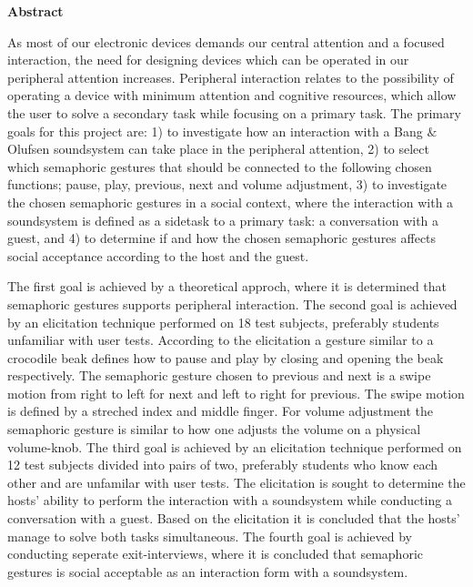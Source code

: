 \begin{center}
	\textbf{{\huge Abstract}}
\end{center}
%
As most of our electronic devices demands our central attention and a focused interaction, the need for designing devices which can be operated in our peripheral attention increases. Peripheral interaction relates to the possibility of operating a device with minimum attention and cognitive resources, which allow the user to solve a secondary task while focusing on a primary task. The primary goals for this project are: 1) to investigate how an interaction with a Bang $\&$ Olufsen soundsystem can take place in the peripheral attention, 2) to select which semaphoric gestures that should be connected to the following chosen functions; pause, play, previous, next and volume adjustment, 3) to investigate the chosen semaphoric gestures in a social context, where the interaction with a soundsystem is defined as a sidetask to a primary task: a conversation with a guest, and 4) to determine if and how the chosen semaphoric gestures affects social acceptance according to the host and the guest.            

The first goal is achieved by a theoretical approch, where it is determined that semaphoric gestures supports peripheral interaction. The second goal is achieved by an elicitation technique performed on 18 test subjects, preferably students unfamiliar with user tests. According to the elicitation a gesture similar to a crocodile beak defines how to pause and play by closing and opening the beak respectively. The semaphoric gesture chosen to previous and next is a swipe motion from right to left for next and left to right for previous. The swipe motion is defined by a streched index and middle finger. For volume adjustment the semaphoric gesture is similar to how one adjusts the volume on a physical volume-knob. The third goal is achieved by an elicitation technique performed on 12 test subjects divided into pairs of two, preferably students who know each other and are unfamilar with user tests. The elicitation is sought to determine the hosts' ability to perform the interaction with a soundsystem while conducting a conversation with a guest. Based on the elicitation it is concluded that the hosts' manage to solve both tasks simultaneous. The fourth goal is achieved by conducting seperate exit-interviews, where it is concluded that semaphoric gestures is social acceptable as an interaction form with a soundsystem.